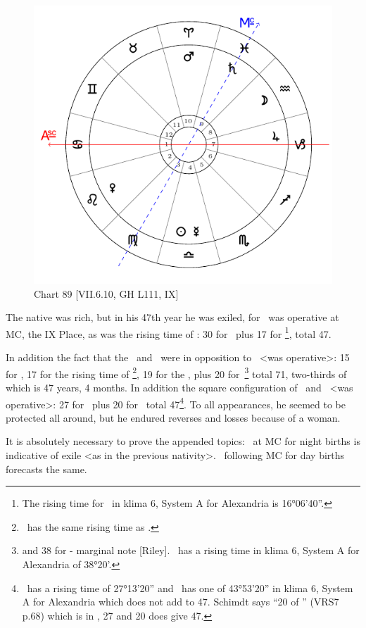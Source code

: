 \begin{figure}
\centering
\vspace{0pt}
\includegraphics[width=.68\textwidth]{charts/7_6_10}
\caption{Chart 89 [VII.6.10, GH L111, IX] }
\label{fig:chart89}
\end{figure} 

The native was rich, but in his 47th year he was exiled, for \Saturn\, was operative at MC, the IX Place, as was the rising time of \Pisces: 30 for \Saturn\, plus 17 for \Pisces\footnote{The rising time for \Pisces\, in klima 6, System A for Alexandria is 16°06'40''.}, total 47. 

In addition the fact that the \Sun\, and \Mercury\, were in opposition to \Mars\, <was operative>: 15 for \Mars, 17 for the rising time of \Aries\footnote{\Aries\, has the same rising time as \Pisces.}, 19 for the \Sun, plus 20 for \Mercury\,\footnote{and 38 for \Leo - marginal note [Riley]. \Leo\, has a rising time in klima 6, System A for Alexandria of 38°20'.} total 71, two-thirds of which is 47 years, 4 months. In addition the square configuration of \Libra\, and \Capricorn\, <was operative>: 27 for \Capricorn\, plus 20 for \Libra\, total 47\footnote{\Capricorn\, has a rising time of 27°13'20'' and \Libra\, has one of 43°53'20'' in klima 6, System A for Alexandria which does not add to 47. Schimdt says ``20 of \Mercury'' (VRS7 p.68) which is in \Libra, 27 and 20 does give 47.}. To all appearances, he seemed to be protected all around, but he endured reverses and losses because of a woman.

It \mndl is absolutely necessary to prove the appended topics: \Saturn\, at MC for night births is indicative of exile <as in the previous nativity>. \Mars\, following MC for day births forecasts the same. 

